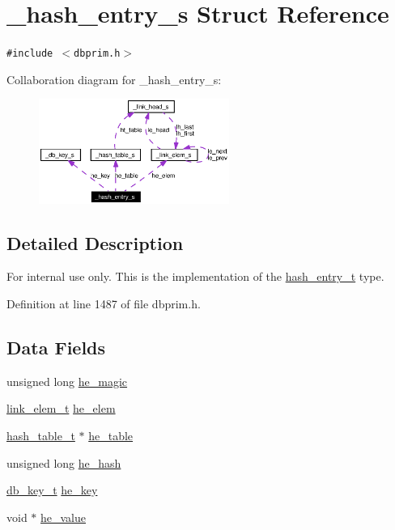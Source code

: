 \hypertarget{struct__hash__entry__s}{
\section{\_\-hash\_\-entry\_\-s Struct Reference}
\label{struct__hash__entry__s}
}
{\tt \#include $<$dbprim.h$>$}

Collaboration diagram for \_\-hash\_\-entry\_\-s:\begin{figure}[H]
\begin{center}
\leavevmode
\includegraphics[width=176pt]{struct__hash__entry__s__coll__graph}
\end{center}
\end{figure}


\subsection{Detailed Description}
\begin{Desc}
\item[For internal use only.]
This is the implementation of the \hyperlink{group__dbprim__hash_ga2}{hash\_\-entry\_\-t} type.\end{Desc}




Definition at line 1487 of file dbprim.h.\subsection*{Data Fields}
\begin{CompactItemize}
\item 
unsigned long \hyperlink{struct__hash__entry__s_o0}{he\_\-magic}
\item 
\hyperlink{struct__link__elem__s}{link\_\-elem\_\-t} \hyperlink{struct__hash__entry__s_o1}{he\_\-elem}
\item 
\hyperlink{struct__hash__table__s}{hash\_\-table\_\-t} $\ast$ \hyperlink{struct__hash__entry__s_o2}{he\_\-table}
\item 
unsigned long \hyperlink{struct__hash__entry__s_o3}{he\_\-hash}
\item 
\hyperlink{struct__db__key__s}{db\_\-key\_\-t} \hyperlink{struct__hash__entry__s_o4}{he\_\-key}
\item 
void $\ast$ \hyperlink{struct__hash__entry__s_o5}{he\_\-value}
\end{CompactItemize}


